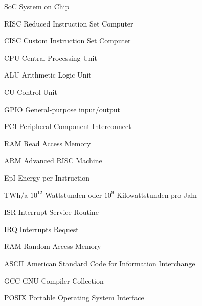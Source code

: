 \begin{abkuerzungen}[MUSTER] %
\item[SoC] System on Chip
\item[RISC] Reduced Instruction Set Computer
\item[CISC] Custom Instruction Set Computer
\item[CPU] Central Processing Unit
\item[ALU] Arithmetic Logic Unit
\item[CU] Control Unit
\item[GPIO] General-purpose input/output
\item[PCI] Peripheral Component Interconnect
\item[RAM] Read Access Memory
\item[ARM] Advanced RISC Machine
\item[EpI] Energy per Instruction
\item[TWh/a] $10^{12}$ Wattstunden oder $10^{9}$ Kilowattstunden pro Jahr
\item[ISR] Interrupt-Service-Routine
\item[IRQ] Interrupts Request
\item[RAM] Random Access Memory
\item[ASCII] American Standard Code for Information Interchange
\item[GCC] GNU Compiler Collection
\item[POSIX] Portable Operating System Interface

\end{abkuerzungen}
